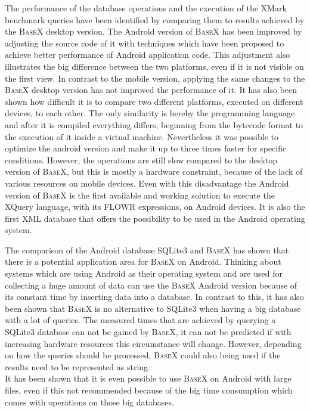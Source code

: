 The performance of the database operations and the execution of the XMark benchmark queries have been identified by comparing them to results achieved by the \textsc{BaseX} desktop version.
The Android version of \textsc{BaseX} has been improved by adjusting the source code of it with techniques which have been proposed to achieve better performance of Android application code.
This adjustment also illustrates the big difference between the two platforms, even if it is not visible on the first view.
In contrast to the mobile version, applying the same changes to the \textsc{BaseX} desktop version has not improved the performance of it.
It has also been shown how difficult it is to compare two different platforms, executed on different devices, to each other.
The only similarity is hereby the programming language and after it is compiled everything differs, beginning from the bytecode format to the execution of it inside a virtual machine.
Nevertheless it was possible to optimize the android version and make it up to three times faster for specific conditions.
However, the operations are still slow compared to the desktop version of \textsc{BaseX}, but this is mostly a hardware constraint, because of the lack of various resources on mobile devices.
Even with this disadvantage the Android version of \textsc{BaseX} is the first available and working solution to execute the XQuery language, with its FLOWR expressions, on Android devices.
It is also the first XML database that offers the possibility to be used in the Android operating system.


The comparison of the Android database SQLite3 and \textsc{BaseX} has shown that there is a potential application area for \textsc{BaseX} on Android.
Thinking about systems which are using Android as their operating system and are used for collecting a huge amount of data can use the \textsc{BaseX} Android version because of its constant time by inserting data into a database. 
In contrast to this, it has also been shown that \textsc{BaseX} is no alternative to SQLite3 when having a big database with a lot of queries.
The measured times that are achieved by querying a SQLite3 database can not be gained by \textsc{BaseX}, it can not be predicted if with increasing hardware resources this circumstance will change.
However, depending on how the queries should be processed, \textsc{BaseX} could also being used if the results need to be represented as string.\\
It has been shown that it is even possible to use \textsc{BaseX} on Android with large files, even if this not recommended because of the big time consumption which comes with operations on those big databases.

